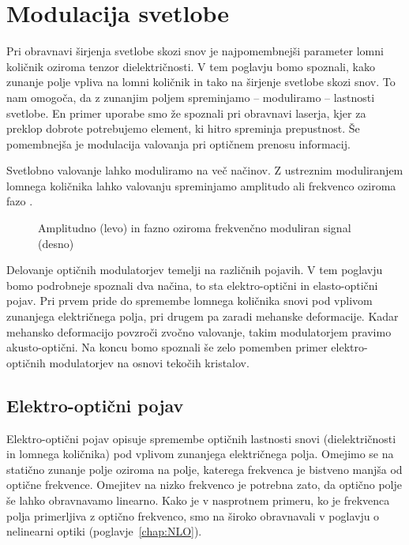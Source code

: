 
\chapter{Modulacija svetlobe}

Pri obravnavi širjenja svetlobe skozi snov je najpomembnejši parameter lomni količnik
oziroma tenzor dielektričnosti. V tem poglavju bomo spoznali, kako zunanje polje vpliva 
na lomni količnik in tako na širjenje svetlobe skozi snov. To nam omogoča,
da z zunanjim poljem spreminjamo -- moduliramo -- lastnosti svetlobe. En primer uporabe smo že spoznali pri 
obravnavi laserja, kjer za preklop dobrote potrebujemo element, ki hitro spreminja 
prepustnost. Še pomembnejša je modulacija valovanja pri optičnem prenosu informacij.

Svetlobno valovanje lahko moduliramo na več načinov. Z ustreznim moduliranjem
lomnega količnika lahko valovanju spreminjamo amplitudo 
ali frekvenco oziroma fazo
. 
\begin{figure}[h]
\centering
\def\svgwidth{140truemm} 

\caption{Amplitudno (levo) in fazno oziroma frekvenčno moduliran signal (desno)
}
\label{fig:amfm}
\end{figure}

Delovanje optičnih modulatorjev temelji na različnih pojavih. V tem poglavju bomo 
podrobneje spoznali dva načina, to sta elektro-optični in elasto-optični pojav. 
Pri prvem pride do spremembe lomnega količnika snovi pod vplivom zunanjega električnega polja, 
pri drugem pa zaradi mehanske deformacije. Kadar mehansko deformacijo povzroči zvočno valovanje, 
takim modulatorjem pravimo akusto-optični. Na koncu bomo spoznali še zelo pomemben 
primer elektro-optičnih modulatorjev na osnovi tekočih kristalov.

\section{Elektro-optični pojav}
Elektro-optični pojav opisuje spremembe optičnih lastnosti 
snovi (dielektričnosti in lomnega količnika) pod vplivom zunanjega električnega polja. 
Omejimo se na statično zunanje polje oziroma
na polje, katerega frekvenca je bistveno manjša od optične frekvence. Omejitev na nizko 
frekvenco je potrebna zato, da optično polje še lahko obravnavamo linearno. 
Kako je v nasprotnem primeru, ko je frekvenca polja primerljiva z optično frekvenco, 
smo na široko obravnavali v poglavju o nelinearni optiki (poglavje~\ref{chap:NLO}).

